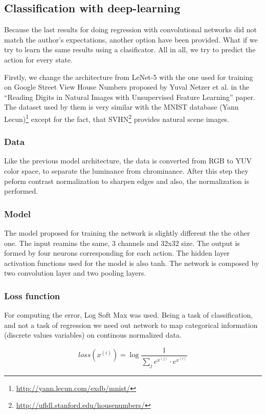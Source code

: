 \subsection{Classification with deep-learning}

Because the last results for doing regression with convolutional networks did not match the author's expectations, another option have been provided. What if we try to learn the same results using a clasificator. All in all, we try to predict the action for every state.

Firstly, we change the architecture from LeNet-5 with the one used for training on Google Street View House Numbers proposed by Yuval Netzer et al. in the ``Reading Digits in Natural Images with Unsupervised Feature Learning''\cite{svhn} paper. The dataset used by them is very similar with the MNIST database (Yann Lecun)\footnote{\url{http://yann.lecun.com/exdb/mnist/}} except for the fact, that SVHN\footnote{\url{http://ufldl.stanford.edu/housenumbers/}} provides natural scene images.

\subsubsection{Data}
Like the previous model architecture, the data is converted from RGB to YUV color space, to separate the luminance from chrominance. After this step they peform contrast normalization to sharpen edges and also, the normalization is performed.

\subsubsection{Model}
The model proposed for training the network is slightly different the the other one. The input reamins the same, 3 channels and 32x32 size. The output is formed by four neurons corresponding for each action. The hidden layer activation functions used for the model is also tanh. The network is composed by two convolution layer and two pooling layers.

\subsubsection{Loss function}
For computing the error, Log Soft Max was used. Being a task of classification, and not a task of regression we need out network to map categorical information (discrete values variables) on continous normalized data.

\begin{equation}
loss(x^{(i)}) = \log {\frac{1}{\displaystyle\sum_{j} e^{x^{(j)}}\cdot e^{x^{(i)}}}}
\end{equation}

